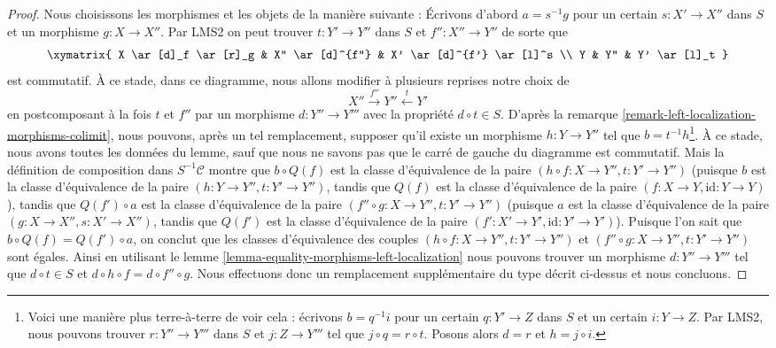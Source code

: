 \begin{proof}
Nous choisissons les morphismes et les objets de la manière suivante :
Écrivons d'abord $a = s^{-1}g$ pour un certain $s : X' \to X''$ dans $S$ et un morphisme $g : X \to X''$. Par LMS2 on peut trouver $t : Y' \to Y''$ dans $S$ et $f'' : X'' \to Y''$ de sorte que
$$
\xymatrix{
X \ar[d]_f \ar[r]_g & X'' \ar[d]^{f''} & X' \ar[d]^{f'} \ar[l]^s \\
Y & Y'' & Y' \ar[l]_t
}
$$
est commutatif. À ce stade, dans ce diagramme, nous
allons modifier à plusieurs reprises notre choix de
$$
X'' \xrightarrow{f''} Y'' \xleftarrow{t} Y'
$$
en postcomposant à la fois $t$ et $f''$ par un morphisme $d : Y'' \to Y'''$
avec la propriété $d \circ t \in S$. D'après la remarque
\ref{remark-left-localization-morphisms-colimit}, nous pouvons, après un tel
remplacement, supposer qu'il existe un morphisme $h : Y \to Y''$ tel que $b = t^{-1}h$\footnote{Voici une manière plus terre-à-terre de voir
cela : écrivons $b = q^{-1}i$ pour un certain $q : Y' \to Z$ dans $S$ et un certain
$i : Y \to Z$. Par LMS2, nous pouvons trouver $r : Y'' \to Y'''$ dans $S$ et
$j : Z \to Y'''$ tel que $j \circ q = r \circ t$. Posons alors $d = r$ et $h = j \circ i$.}. À ce stade, nous avons toutes les données du lemme, sauf
que nous ne savons pas que le carré de gauche du diagramme est commutatif.
Mais la définition de composition dans $S^{-1} \mathcal{C}$ montre que $b \circ Q\left(f\right)$ est la classe d'équivalence de la paire $(h \circ f : X \to Y'', t : Y' \to Y'')$ (puisque $b$ est la classe d'équivalence de la paire
$(h : Y \to Y'', t : Y' \to Y'')$, tandis que $Q\left(f\right)$ est la classe
d'équivalence de la paire $(f : X \to Y, \text{id} : Y \to Y)$), tandis que
$Q\left(f'\right) \circ a$ est la classe d'équivalence de la paire $(f'' \circ g : X \to Y'', t : Y' \to Y'')$ (puisque $a$ est la classe d'équivalence de la
paire $(g : X \to X'', s : X' \to X'')$, tandis que $Q\left(f'\right)$ est la
classe d'équivalence de la paire $(f' : X' \to Y', \text{id} : Y' \to Y')$). Puisque l'on sait que $b \circ Q\left(f\right) = Q\left(f'\right) \circ a$, on conclut que les classes d'équivalence des couples $(h \circ f : X \to Y'', t : Y' \to Y'')$ et $(f'' \circ g : X \to Y'', t : Y' \to Y'')$ sont
égales. Ainsi en utilisant le lemme
\ref{lemma-equality-morphisms-left-localization} nous pouvons trouver un
morphisme $d : Y'' \to Y'''$ tel que $d \circ t \in S$ et $d \circ h \circ f = d \circ f'' \circ g$. Nous effectuons donc un remplacement supplémentaire du
type décrit ci-dessus et nous concluons.
\end{proof}

